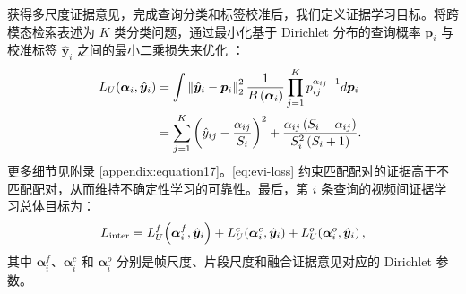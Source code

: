获得多尺度证据意见，完成查询分类和标签校准后，我们定义证据学习目标。将跨模态检索表述为 $K$ 类分类问题，通过最小化基于 Dirichlet 分布的查询概率 $\boldsymbol{p}_i$ 与校准标签 $\hat{\boldsymbol{y}}_i$ 之间的最小二乘损失来优化 \modelname{}：
\vspace{-.6em}
\begin{equation}
   \!\!\! \begin{aligned}
        {L}_{U}(\boldsymbol{\alpha}_{i},{\hat{\boldsymbol y}}_{i})&=\int\left\|\hat{\boldsymbol y}_i-\boldsymbol{p}_i\right\|_2^2 \frac{1}{B\left(\boldsymbol{\alpha}_i\right)} \prod_{j=1}^{K} p_{i j}^{\alpha_{i j}-1} d \boldsymbol{p}_i \\
        & = \sum_{j=1}^{K} \left(\hat{y}_{i j}-\frac{\alpha_{i j}}{S_i}\right)^2+\frac{\alpha_{i j}\left(S_i-\alpha_{i j}\right)}{S_i^2\left(S_i+1\right)}.
    \end{aligned}
    \label{eq:evi-loss}
\vspace{-.6em}
\end{equation}
更多细节见附录 \ref{appendix:equation17}。\cref{eq:evi-loss} 约束匹配配对的证据高于不匹配配对，从而维持不确定性学习的可靠性。最后，第 $i$ 条查询的视频间证据学习总体目标为：
\vspace{-.6em}
\begin{equation}
    {L}_{\mathrm{inter}} =
    {L}^f_{U}\!\left(\boldsymbol{\alpha}^{f}_{i}, \hat{\boldsymbol{y}}_{i}\right)
    + {L}^c_{U}\!\left(\boldsymbol{\alpha}^{c}_{i}, \hat{\boldsymbol{y}}_{i}\right)
    + {L}^o_{U}\!\left(\boldsymbol{\alpha}^{o}_{i}, \hat{\boldsymbol{y}}_{i}\right),
\vspace{-.6em}
\end{equation}
其中 $\boldsymbol{\alpha}^{f}_{i}$、$\boldsymbol{\alpha}^{c}_{i}$ 和 $\boldsymbol{\alpha}^{o}_{i}$ 分别是帧尺度、片段尺度和融合证据意见对应的 Dirichlet 参数。


